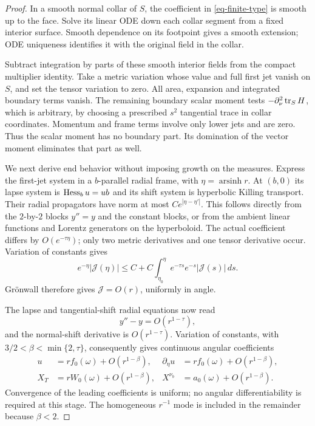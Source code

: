 \begin{proof}
In a smooth normal collar of \(S\), the coefficient in
\eqref{eq-finite-type} is smooth up to the face.  Solve its linear
ODE down each collar segment from a fixed interior surface.
Smooth dependence on its footpoint gives a smooth extension; ODE
uniqueness identifies it with the original field in the collar.

Subtract integration by parts of these smooth interior fields from
the compact multiplier identity. Take a metric variation whose value
and full first jet vanish on \(S\), and set the tensor variation to zero.
All area, expansion and integrated boundary terms vanish.
The remaining boundary scalar moment tests
\(-\partial_\nu^2\operatorname{tr}_SH\), which is arbitrary, by choosing a
prescribed \(s^2\) tangential trace in collar coordinates.
Momentum and frame terms involve only lower jets and are zero.
Thus the scalar moment has no boundary part.  Its domination of
the vector moment eliminates that part as well.

We next derive end behavior without imposing growth on the
measures.  Express the first-jet system in a \(b\)-parallel radial
frame, with \(\eta=\operatorname{arsinh}r\).
At \((b,0)\) its lapse system is \(\operatorname{Hess}_bu=ub\) and its shift
system is hyperbolic Killing transport.  Their radial propagators
have norm at most \(C e^{|\eta-\eta'|}\).  This follows directly
from the \(2\)-by-\(2\) blocks \(y''=y\) and the constant blocks,
or from the ambient linear functions and Lorentz generators
on the hyperboloid.
The actual coefficient differs by \(O(e^{-\tau\eta})\);
only two metric derivatives and one tensor derivative occur.
Variation of constants gives
\[
 e^{-\eta}|\mathcal J(\eta)|
 \leq C+C\int_{\eta_0}^{\eta}
        e^{-\tau s}e^{-s}|\mathcal J(s)|\,ds.
 \]
Grönwall therefore gives \(\mathcal J=O(r)\), uniformly in angle.

The lapse and tangential-shift radial equations now read
\[
 y''-y=O(r^{1-\tau}),
\]
and the normal-shift derivative is \(O(r^{1-\tau})\).
Variation of constants, with
\(3/2<\beta<\min\{2,\tau\}\), consequently gives continuous angular
coefficients
\begin{align*}
 u&=r f_0(\omega)+O(r^{1-\beta}),&
 \partial_{\eta}u&=r f_0(\omega)+O(r^{1-\beta}),\\
 X_T&=r W_0(\omega)+O(r^{1-\beta}),&
 X^{\nu_b}&=a_0(\omega)+O(r^{1-\beta}).
\end{align*}
Convergence of the leading coefficients is uniform; no angular
differentiability is required at this stage.  The homogeneous
\(r^{-1}\) mode is included in the remainder because \(\beta<2\).


\end{proof}
